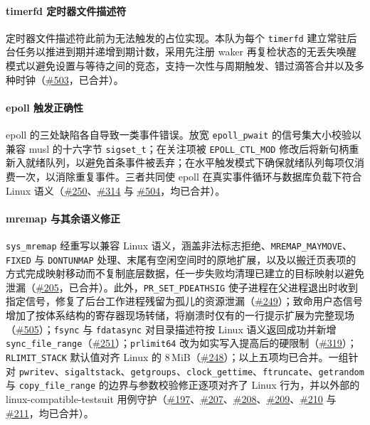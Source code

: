 \paragraph{timerfd 定时器文件描述符}
定时器文件描述符此前为无法触发的占位实现。本队为每个 \texttt{timerfd} 建立常驻后台任务以推进到期并递增到期计数，采用先注册 waker 再复检状态的无丢失唤醒模式以避免设置与等待之间的竞态，支持一次性与周期触发、错过滴答合并以及多种时钟（\href{https://github.com/rcore-os/tgoskits/pull/503}{\#503}，已合并）。

\paragraph{epoll 触发正确性}
epoll 的三处缺陷各自导致一类事件错误。放宽 \texttt{epoll\_pwait} 的信号集大小校验以兼容 musl 的十六字节 \texttt{sigset\_t}；在关注项被 \texttt{EPOLL\_CTL\_MOD} 修改后将新句柄重新入就绪队列，以避免首条事件被丢弃；在水平触发模式下确保就绪队列每项仅消费一次，以消除重复事件。三者共同使 epoll 在真实事件循环与数据库负载下符合 Linux 语义（\href{https://github.com/rcore-os/tgoskits/pull/250}{\#250}、\href{https://github.com/rcore-os/tgoskits/pull/314}{\#314} 与 \href{https://github.com/rcore-os/tgoskits/pull/504}{\#504}，均已合并）。

\paragraph{mremap 与其余语义修正}
\texttt{sys\_mremap} 经重写以兼容 Linux 语义，涵盖非法标志拒绝、\texttt{MREMAP\_MAYMOVE}、\texttt{FIXED} 与 \texttt{DONTUNMAP} 处理、末尾有空闲空间时的原地扩展，以及以搬迁页表项的方式完成映射移动而不复制底层数据，任一步失败均清理已建立的目标映射以避免泄漏（\href{https://github.com/rcore-os/tgoskits/pull/205}{\#205}，已合并）。此外，\texttt{PR\_SET\_PDEATHSIG} 使子进程在父进程退出时收到指定信号，修复了后台工作进程残留为孤儿的资源泄漏（\href{https://github.com/rcore-os/tgoskits/pull/249}{\#249}）；致命用户态信号增加了按体系结构的寄存器现场转储，将崩溃时仅有的一行提示扩展为完整现场（\href{https://github.com/rcore-os/tgoskits/pull/505}{\#505}）；\texttt{fsync} 与 \texttt{fdatasync} 对目录描述符按 Linux 语义返回成功并新增 \texttt{sync\_file\_range}（\href{https://github.com/rcore-os/tgoskits/pull/251}{\#251}）；\texttt{prlimit64} 改为如实写入提高后的硬限制（\href{https://github.com/rcore-os/tgoskits/pull/319}{\#319}）；\texttt{RLIMIT\_STACK} 默认值对齐 Linux 的 8\,MiB（\href{https://github.com/rcore-os/tgoskits/pull/248}{\#248}）；以上五项均已合并。一组针对 \texttt{pwritev}、\texttt{sigaltstack}、\texttt{getgroups}、\texttt{clock\_gettime}、\texttt{ftruncate}、\texttt{getrandom} 与 \texttt{copy\_file\_range} 的边界与参数校验修正逐项对齐了 Linux 行为，并以外部的 linux-compatible-testsuit 用例守护（\href{https://github.com/rcore-os/tgoskits/pull/197}{\#197}、\href{https://github.com/rcore-os/tgoskits/pull/207}{\#207}、\href{https://github.com/rcore-os/tgoskits/pull/208}{\#208}、\href{https://github.com/rcore-os/tgoskits/pull/209}{\#209}、\href{https://github.com/rcore-os/tgoskits/pull/210}{\#210} 与 \href{https://github.com/rcore-os/tgoskits/pull/211}{\#211}，均已合并）。

